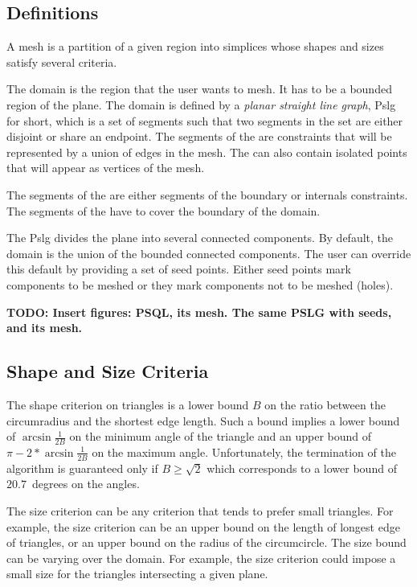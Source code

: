 \subsection{Definitions}
\label{sec:Mesh_2_meshes_definition}

A mesh is a partition of a given region into simplices whose shapes
and sizes satisfy several criteria.

The domain is the region that the user wants to mesh. It has to be
  a bounded region of the plane. The domain is defined by a \emph{planar
  straight line graph}, {\sc Pslg} for short, which is a set of segments
  such that two segments in the set are either disjoint or share an
  endpoint. The segments of the  are constraints that will be
  represented by a union of edges in the mesh. The  can also
  contain isolated points that will appear as vertices of the mesh.

The segments of the  are either segments of the
boundary or internals constraints. The segments of the  have to
cover the boundary of the domain.

The {\sc Pslg} divides the plane into several connected components. By
default, the domain is the union of the bounded connected components. The
user can override this default by providing a set of seed points. Either
seed points mark components to be meshed or they mark components not to be
meshed (holes).

\textbf{TODO: Insert figures: PSQL, its mesh. The same PSLG with seeds, and
its mesh.}

\subsection{Shape and Size Criteria}
\label{sec:Mesh_2_criteria}

The shape criterion on triangles is a lower bound $B$ on the ratio
between the circumradius and the shortest edge length.  Such a bound
implies a lower bound of $\arcsin{\frac{1}{2B}}$ on the minimum angle
of the triangle and an upper bound of $\pi - 2* \arcsin{\frac{1}{2B}}$
on the maximum angle.  Unfortunately, the termination of the algorithm
is guaranteed only if $B \ge \sqrt{2}$ which corresponds to a lower
bound of $20.7$~degrees on the angles.

The size criterion can be any criterion that tends to prefer small
triangles. For example, the size criterion can be an upper bound on the
length of longest edge of triangles, or an upper bound on the radius of the
circumcircle. The size bound can be varying over the domain. For example,
the size criterion could impose a small size for the triangles intersecting
a given plane.

